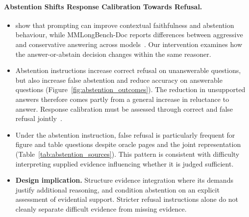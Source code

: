 \paragraph{Abstention Shifts Response Calibration Towards Refusal.}
\begin{itemize}
    \item \citeauthor{zhou2023context} show that prompting can improve contextual faithfulness and abstention behaviour, while MMLongBench-Doc reports differences between aggressive and conservative answering across models~\citep{ma2024mmlongbench}. Our intervention examines how the answer-or-abstain decision changes within the same reasoner.

    \item Abstention instructions increase correct refusal on unanswerable questions, but also increase false abstention and reduce accuracy on answerable questions (Figure~\ref{fig:abstention_outcomes}). The reduction in unsupported answers therefore comes partly from a general increase in reluctance to answer. Response calibration must be assessed through correct and false refusal jointly~\citep{whitehead2022reliable}.

    \item Under the abstention instruction, false refusal is particularly frequent for figure and table questions despite oracle pages and the joint representation (Table~\ref{tab:abstention_sources}). This pattern is consistent with difficulty interpreting supplied evidence influencing whether it is judged sufficient.

    \item \textbf{Design implication.} Structure evidence integration where its demands justify additional reasoning, and condition abstention on an explicit assessment of evidential support. Stricter refusal instructions alone do not cleanly separate difficult evidence from missing evidence.
\end{itemize}